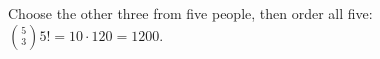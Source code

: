 Choose the other three from five people, then order all five: $\binom53 5!=10\cdot120=\boxed{1200}$.
